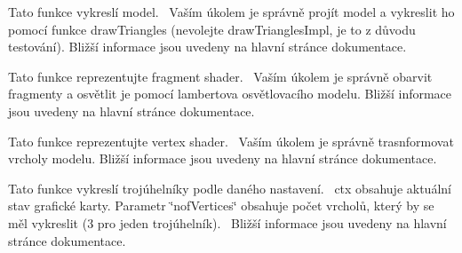 
\begin{DoxyRefList}
\item[Global \mbox{\hyperlink{drawModel_8hpp_ac14f542e0c0210cb47b47abcfa2fc279}{draw\+Model}} (\mbox{\hyperlink{structGPUContext}{G\+P\+U\+Context}} \&ctx, \mbox{\hyperlink{structModel}{Model}} const \&model, glm\+::mat4 const \&proj, glm\+::mat4 const \&view, glm\+::vec3 const \&light, glm\+::vec3 const \&camera)]\label{todo__todo000001}%
%
Tato funkce vykreslí model.~\newline
 Vaším úkolem je správně projít model a vykreslit ho pomocí funkce draw\+Triangles (nevolejte draw\+Triangles\+Impl, je to z důvodu testování). Bližší informace jsou uvedeny na hlavní stránce dokumentace.  
\item[Global \mbox{\hyperlink{drawModel_8hpp_a00d11e84945ed4f7699102c077328bd0}{draw\+Model\+\_\+fragment\+Shader}} (\mbox{\hyperlink{structOutFragment}{Out\+Fragment}} \&out\+Fragment, \mbox{\hyperlink{structInFragment}{In\+Fragment}} const \&in\+Fragment, \mbox{\hyperlink{structUniforms}{Uniforms}} const \&uniforms)]\label{todo__todo000003}%
%
Tato funkce reprezentujte fragment shader.~\newline
 Vaším úkolem je správně obarvit fragmenty a osvětlit je pomocí lambertova osvětlovacího modelu. Bližší informace jsou uvedeny na hlavní stránce dokumentace.  
\item[Global \mbox{\hyperlink{drawModel_8hpp_af28c26a23a26d8bb27f8a24833037c3c}{draw\+Model\+\_\+vertex\+Shader}} (\mbox{\hyperlink{structOutVertex}{Out\+Vertex}} \&out\+Vertex, \mbox{\hyperlink{structInVertex}{In\+Vertex}} const \&in\+Vertex, \mbox{\hyperlink{structUniforms}{Uniforms}} const \&uniforms)]\label{todo__todo000002}%
%
Tato funkce reprezentujte vertex shader.~\newline
 Vaším úkolem je správně trasnformovat vrcholy modelu. Bližší informace jsou uvedeny na hlavní stránce dokumentace.  
\item[Global \mbox{\hyperlink{gpu_8cpp_a2ad1fed3d7e6cddf0f9a3bd339992f40}{draw\+Triangles\+Impl}} (\mbox{\hyperlink{structGPUContext}{G\+P\+U\+Context}} \&ctx, uint32\+\_\+t nof\+Vertices)]\label{todo__todo000004}%
%
Tato funkce vykreslí trojúhelníky podle daného nastavení.~\newline
 ctx obsahuje aktuální stav grafické karty. Parametr \char`\"{}nof\+Vertices\char`\"{} obsahuje počet vrcholů, který by se měl vykreslit (3 pro jeden trojúhelník).~\newline
 Bližší informace jsou uvedeny na hlavní stránce dokumentace. 
\end{DoxyRefList}